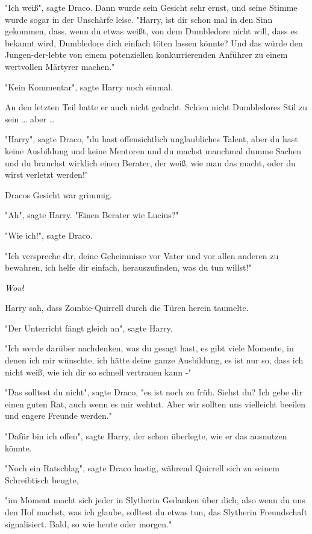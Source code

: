 {"Ich weiß", sagte Draco. Dann wurde sein Gesicht sehr ernst, und seine Stimme wurde sogar in der Unschärfe leise. "Harry, ist dir schon mal in den Sinn gekommen, dass, wenn du etwas weißt, von dem Dumbledore nicht will, dass es bekannt wird, Dumbledore dich einfach töten lassen könnte? Und das würde den Jungen-der-lebte von einem potenziellen konkurrierenden Anführer zu einem wertvollen Märtyrer machen."

"Kein Kommentar", sagte Harry noch einmal.

An den letzten Teil hatte er auch nicht gedacht. Schien nicht Dumbledores Stil zu sein … aber …

"Harry", sagte Draco, "du hast offensichtlich unglaubliches Talent, aber du hast keine Ausbildung und keine Mentoren und du machst manchmal dumme Sachen und du brauchst wirklich einen Berater, der weiß, wie man das macht, oder du wirst verletzt werden!"

Dracos Gesicht war grimmig.

"Ah", sagte Harry. "Einen Berater wie Lucius?"

"Wie ich!", sagte Draco.

"Ich verspreche dir, deine Geheimnisse vor Vater und vor allen anderen zu bewahren, ich helfe dir einfach, herauszufinden, was du tun willst!"

\emph{Wow}!

Harry sah, dass Zombie-Quirrell durch die Türen herein taumelte.

"Der Unterricht fängt gleich an", sagte Harry.

"Ich werde darüber nachdenken, was du gesagt hast, es gibt viele Momente, in denen ich mir wünschte, ich hätte deine ganze Ausbildung, es ist nur so, dass ich nicht weiß, wie ich dir so schnell vertrauen kann -"

"Das solltest du nicht", sagte Draco, "es ist noch zu früh. Siehst du? Ich gebe dir einen guten Rat, auch wenn es mir wehtut. Aber wir sollten uns vielleicht beeilen und engere Freunde werden."

"Dafür bin ich offen", sagte Harry, der schon überlegte, wie er das ausnutzen könnte.

"Noch ein Ratschlag", sagte Draco hastig, während Quirrell sich zu seinem Schreibtisch beugte,

"im Moment macht sich jeder in Slytherin Gedanken über dich, also wenn du uns den Hof machst, was ich glaube, solltest du etwas tun, das Slytherin Freundschaft signalisiert. Bald, so wie heute oder morgen."

}
